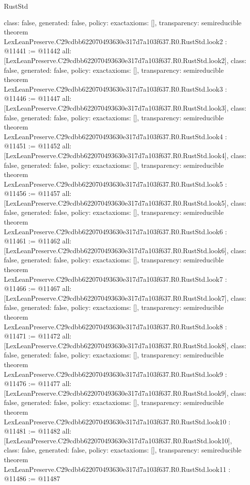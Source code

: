 \begin{lexlean}{RustStd}
\begin{coremodule}
{  class: false,
  generated: false,
  policy: exact{axioms: []},
  transparency: semireducible
}
theorem LexLeanPreserve.C29cdbb622070493630e317d7a103f637.R0.RustStd.look2 : @11441 := @11442 {
  all: [LexLeanPreserve.C29cdbb622070493630e317d7a103f637.R0.RustStd.look2],
  class: false,
  generated: false,
  policy: exact{axioms: []},
  transparency: semireducible
}
theorem LexLeanPreserve.C29cdbb622070493630e317d7a103f637.R0.RustStd.look3 : @11446 := @11447 {
  all: [LexLeanPreserve.C29cdbb622070493630e317d7a103f637.R0.RustStd.look3],
  class: false,
  generated: false,
  policy: exact{axioms: []},
  transparency: semireducible
}
theorem LexLeanPreserve.C29cdbb622070493630e317d7a103f637.R0.RustStd.look4 : @11451 := @11452 {
  all: [LexLeanPreserve.C29cdbb622070493630e317d7a103f637.R0.RustStd.look4],
  class: false,
  generated: false,
  policy: exact{axioms: []},
  transparency: semireducible
}
theorem LexLeanPreserve.C29cdbb622070493630e317d7a103f637.R0.RustStd.look5 : @11456 := @11457 {
  all: [LexLeanPreserve.C29cdbb622070493630e317d7a103f637.R0.RustStd.look5],
  class: false,
  generated: false,
  policy: exact{axioms: []},
  transparency: semireducible
}
theorem LexLeanPreserve.C29cdbb622070493630e317d7a103f637.R0.RustStd.look6 : @11461 := @11462 {
  all: [LexLeanPreserve.C29cdbb622070493630e317d7a103f637.R0.RustStd.look6],
  class: false,
  generated: false,
  policy: exact{axioms: []},
  transparency: semireducible
}
theorem LexLeanPreserve.C29cdbb622070493630e317d7a103f637.R0.RustStd.look7 : @11466 := @11467 {
  all: [LexLeanPreserve.C29cdbb622070493630e317d7a103f637.R0.RustStd.look7],
  class: false,
  generated: false,
  policy: exact{axioms: []},
  transparency: semireducible
}
theorem LexLeanPreserve.C29cdbb622070493630e317d7a103f637.R0.RustStd.look8 : @11471 := @11472 {
  all: [LexLeanPreserve.C29cdbb622070493630e317d7a103f637.R0.RustStd.look8],
  class: false,
  generated: false,
  policy: exact{axioms: []},
  transparency: semireducible
}
theorem LexLeanPreserve.C29cdbb622070493630e317d7a103f637.R0.RustStd.look9 : @11476 := @11477 {
  all: [LexLeanPreserve.C29cdbb622070493630e317d7a103f637.R0.RustStd.look9],
  class: false,
  generated: false,
  policy: exact{axioms: []},
  transparency: semireducible
}
theorem LexLeanPreserve.C29cdbb622070493630e317d7a103f637.R0.RustStd.look10 : @11481 := @11482 {
  all: [LexLeanPreserve.C29cdbb622070493630e317d7a103f637.R0.RustStd.look10],
  class: false,
  generated: false,
  policy: exact{axioms: []},
  transparency: semireducible
}
theorem LexLeanPreserve.C29cdbb622070493630e317d7a103f637.R0.RustStd.look11 : @11486 := @11487 {
}
\end{coremodule}
\end{lexlean}
